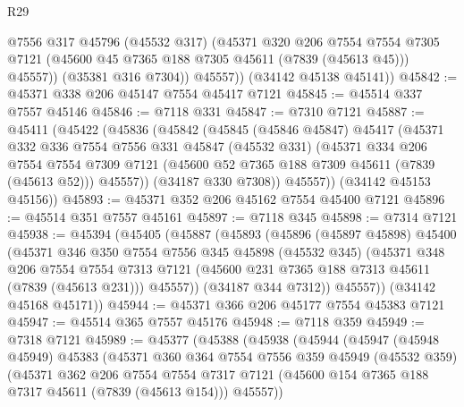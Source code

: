\begin{lexlean}{R29}
\begin{coremodule}
              @7556
              @317
              @45796
              (@45532 @317)
              (@45371
                @320
                @206
                @7554
                @7554
                @7305
                @7121
                (@45600 @45 @7365 @188 @7305 @45611 (@7839 (@45613 @45)))
                @45557))
            (@35381 @316 @7304))
          @45557))
      (@34142 @45138 @45141))
@45842 := @45371 @338 @206 @45147 @7554 @45417 @7121
@45845 := @45514 @337 @7557 @45146
@45846 := @7118 @331
@45847 := @7310 @7121
@45887 := @45411
    (@45422
      (@45836
        (@45842
          (@45845
            (@45846 @45847)
            @45417
            (@45371
              @332
              @336
              @7554
              @7556
              @331
              @45847
              (@45532 @331)
              (@45371
                @334
                @206
                @7554
                @7554
                @7309
                @7121
                (@45600 @52 @7365 @188 @7309 @45611 (@7839 (@45613 @52)))
                @45557))
            (@34187 @330 @7308))
          @45557))
      (@34142 @45153 @45156))
@45893 := @45371 @352 @206 @45162 @7554 @45400 @7121
@45896 := @45514 @351 @7557 @45161
@45897 := @7118 @345
@45898 := @7314 @7121
@45938 := @45394
    (@45405
      (@45887
        (@45893
          (@45896
            (@45897 @45898)
            @45400
            (@45371
              @346
              @350
              @7554
              @7556
              @345
              @45898
              (@45532 @345)
              (@45371
                @348
                @206
                @7554
                @7554
                @7313
                @7121
                (@45600 @231 @7365 @188 @7313 @45611 (@7839 (@45613 @231)))
                @45557))
            (@34187 @344 @7312))
          @45557))
      (@34142 @45168 @45171))
@45944 := @45371 @366 @206 @45177 @7554 @45383 @7121
@45947 := @45514 @365 @7557 @45176
@45948 := @7118 @359
@45949 := @7318 @7121
@45989 := @45377
    (@45388
      (@45938
        (@45944
          (@45947
            (@45948 @45949)
            @45383
            (@45371
              @360
              @364
              @7554
              @7556
              @359
              @45949
              (@45532 @359)
              (@45371
                @362
                @206
                @7554
                @7554
                @7317
                @7121
                (@45600 @154 @7365 @188 @7317 @45611 (@7839 (@45613 @154)))
                @45557))

\end{coremodule}
\end{lexlean}
